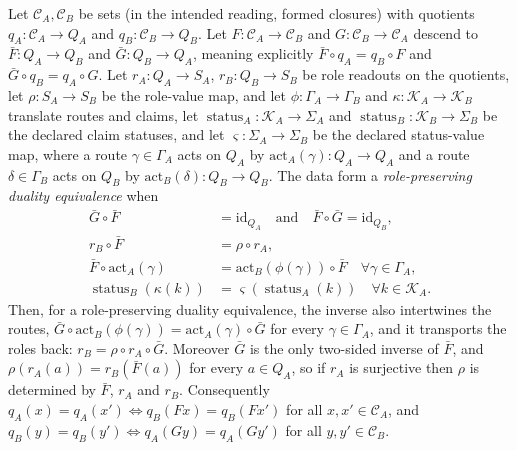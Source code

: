 \begin{theorem}\label{thm:F41}
Let \(\mathcal C_A,\mathcal C_B\) be sets (in the intended reading, formed closures) with quotients
\(q_A:\mathcal C_A\to Q_A\) and \(q_B:\mathcal C_B\to Q_B\).  Let
\(F:\mathcal C_A\to\mathcal C_B\) and
\(G:\mathcal C_B\to\mathcal C_A\) descend to
\(\bar F:Q_A\to Q_B\) and \(\bar G:Q_B\to Q_A\), meaning explicitly
\(\bar F\circ q_A=q_B\circ F\) and
\(\bar G\circ q_B=q_A\circ G\).  Let
\(r_A:Q_A\to S_A\), \(r_B:Q_B\to S_B\) be role readouts on the quotients,
let \(\rho:S_A\to S_B\) be the role-value map, and let
\(\phi:\Gamma_A\to\Gamma_B\) and
\(\kappa:\mathcal K_A\to\mathcal K_B\) translate routes and claims, let
\(\operatorname{status}_A:\mathcal K_A\to\Sigma_A\) and
\(\operatorname{status}_B:\mathcal K_B\to\Sigma_B\) be the declared
claim statuses, and let \(\varsigma:\Sigma_A\to\Sigma_B\) be the
declared status-value map,
where a route \(\gamma\in\Gamma_A\) acts on \(Q_A\) by
\(\mathrm{act}_A(\gamma):Q_A\to Q_A\) and a route
\(\delta\in\Gamma_B\) acts on \(Q_B\) by
\(\mathrm{act}_B(\delta):Q_B\to Q_B\).
The data form a \emph{role-preserving duality equivalence} when
\begin{align*}
  \bar G\circ\bar F&=\mathrm{id}_{Q_A}
  \quad\text{and}\quad
  \bar F\circ\bar G=\mathrm{id}_{Q_B},\\
  r_B\circ\bar F&=\rho\circ r_A,\\
  \bar F\circ \mathrm{act}_A(\gamma)
  &=\mathrm{act}_B(\phi(\gamma))\circ\bar F
  \quad\forall \gamma\in\Gamma_A,\\
  \operatorname{status}_B(\kappa(k))
  &=\varsigma(\operatorname{status}_A(k))
  \quad\forall k\in\mathcal K_A.
\end{align*}
Then, for a role-preserving duality equivalence, the inverse also
intertwines the routes,
\(\bar G\circ\mathrm{act}_B(\phi(\gamma))=\mathrm{act}_A(\gamma)\circ\bar G\)
for every \(\gamma\in\Gamma_A\), and it transports the roles back:
\(r_B=\rho\circ r_A\circ\bar G\). Moreover \(\bar G\) is the only two-sided inverse of
\(\bar F\), and \(\rho(r_A(a))=r_B(\bar F(a))\) for every \(a\in Q_A\), so if \(r_A\)
is surjective then \(\rho\) is determined by \(\bar F\), \(r_A\) and \(r_B\).
Consequently \(q_A(x)=q_A(x')\iff q_B(Fx)=q_B(Fx')\) for all
\(x,x'\in\mathcal C_A\), and \(q_B(y)=q_B(y')\iff q_A(Gy)=q_A(Gy')\) for all
\(y,y'\in\mathcal C_B\).
\end{theorem}
